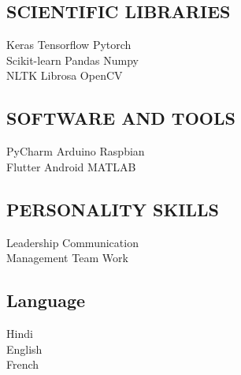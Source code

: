 \documentclass[]{deedy-resume-openfont}
\begin{document}
\begin{minipage}[t]{0.33\textwidth}
\subsection{SCIENTIFIC LIBRARIES}
\textbullet{} Keras \textbullet{} Tensorflow \textbullet{} Pytorch \\
\textbullet{} Scikit-learn \textbullet{} Pandas \textbullet{} Numpy \\
\textbullet{} NLTK \textbullet{} Librosa \textbullet{} OpenCV \\ 
\sectionsep
\subsection{SOFTWARE AND TOOLS}
\textbullet{} PyCharm \textbullet{} Arduino \textbullet{} Raspbian \\
\textbullet{} Flutter \textbullet{} Android \textbullet{} MATLAB \\
\sectionsep
\subsection{PERSONALITY SKILLS}
\textbullet{} Leadership \textbullet{} Communication \\
\textbullet{} Management \textbullet{} Team Work
\sectionsep
\subsection{Language}
 Hindi\\
 English\\
 French\\
%
%

\end{minipage} 
\hfill
\end{document}

